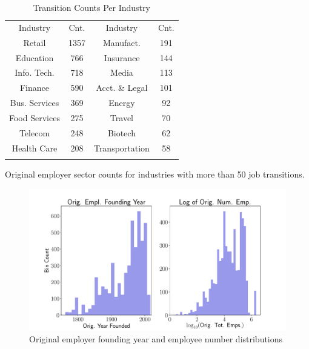 \documentclass[10pt]{article}
\begin{document}
\begin{table}
  \centering
  \caption{Transition Counts Per Industry}
  \begin{tabular}{cccc}
    \rowcolor{gray!50}
      Industry & Cnt. & Industry & Cnt. \\
      Retail & 1357 & Manufact. & 191\\
      Education & 766 & Insurance & 144\\
      Info. Tech. & 718 & Media & 113\\
      Finance & 590 & Acct. \& Legal & 101\\
      Bus. Services & 369 & Energy & 92\\
      Food Services & 275  & Travel & 70\\
      Telecom & 248 & Biotech & 62\\
      Health Care & 208 & Transportation & 58\\
	\label{tab:indtab}
  \end{tabular}
Original employer sector counts for industries with more than 50 job transitions.
\end{table}


\begin{figure}[thb]
    \centering
	\includegraphics[width=1.0\linewidth]{emplstat.pdf}
	\caption{Original employer founding year and employee number distributions}
	\label{fig:emplstat}
\end{figure}
\end{document}
